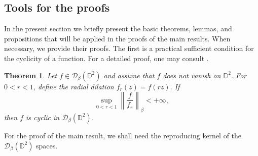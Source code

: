 \documentclass[a4paper,12pt]{amsart}
\newtheorem{thm}{Theorem}[section]
\theoremstyle{definition}
\def\D{\mathbb D}
\begin{document}
\subsection{Tools for the proofs}

In the present section we briefly present the basic theorems, lemmas, and propositions that will be applied in the proofs of the main results. When necessary, we provide their proofs. The first is a practical sufficient condition for the cyclicity of a function. For a detailed proof, one may consult \cite{Knese2019_Aniso_Bidisk}.

\begin{thm} \label{Radial_Dilation}
    Let $f \in \mathcal D_{\beta}(\D^2)$ and assume that $f$ does not vanish on $\D^2$. For $0 < r < 1$, define the radial dilation
    $
        f_r (z) = f(rz).
    $
    If
    \begin{equation*}
        \sup_{0 < r < 1} \left\| \frac{f}{f_r} \right\|_{\beta} < +\infty,
    \end{equation*}
    then $f$ is cyclic in $\mathcal D_{\beta}(\D^2)$.
\end{thm}

For the proof of the main result, we shall need the reproducing kernel of the $\mathcal D_{\beta}(\mathbb{D}^2)$ spaces.
\end{document}
